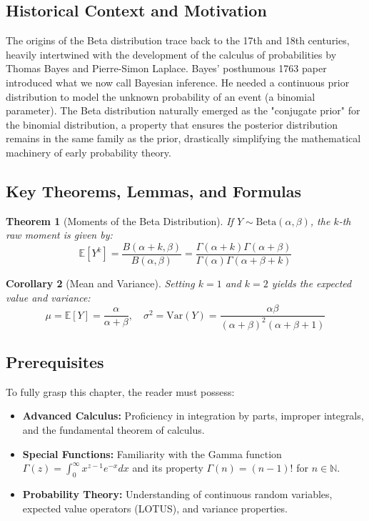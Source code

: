 \documentclass[11pt, a4paper]{article}
\newtheorem{theorem}{Theorem}[section]
\newtheorem{corollary}[theorem]{Corollary}
\theoremstyle{definition}
\theoremstyle{remark}
\newcommand{\N}{\mathbb{N}}
\newcommand{\E}{\mathbb{E}}
\begin{document}
\subsection{Historical Context and Motivation}
The origins of the Beta distribution trace back to the 17th and 18th centuries, heavily intertwined with the development of the calculus of probabilities by Thomas Bayes and Pierre-Simon Laplace. Bayes' posthumous 1763 paper introduced what we now call Bayesian inference. He needed a continuous prior distribution to model the unknown probability of an event (a binomial parameter). The Beta distribution naturally emerged as the "conjugate prior" for the binomial distribution, a property that ensures the posterior distribution remains in the same family as the prior, drastically simplifying the mathematical machinery of early probability theory.

\subsection{Key Theorems, Lemmas, and Formulas}
\begin{theorem}[Moments of the Beta Distribution]
If $Y \sim \text{Beta}(\alpha, \beta)$, the $k$-th raw moment is given by:
\[
\E[Y^k] = \frac{B(\alpha+k, \beta)}{B(\alpha, \beta)} = \frac{\Gamma(\alpha+k)\Gamma(\alpha+\beta)}{\Gamma(\alpha)\Gamma(\alpha+\beta+k)}
\]
\end{theorem}

\begin{corollary}[Mean and Variance]
Setting $k=1$ and $k=2$ yields the expected value and variance:
\[
\mu = \E[Y] = \frac{\alpha}{\alpha+\beta}, \quad \sigma^2 = \text{Var}(Y) = \frac{\alpha\beta}{(\alpha+\beta)^2(\alpha+\beta+1)}
\]
\end{corollary}

\subsection{Prerequisites}
To fully grasp this chapter, the reader must possess:
\begin{itemize}
    \item \textbf{Advanced Calculus:} Proficiency in integration by parts, improper integrals, and the fundamental theorem of calculus.
    \item \textbf{Special Functions:} Familiarity with the Gamma function $\Gamma(z) = \int_0^\infty x^{z-1}e^{-x}dx$ and its property $\Gamma(n) = (n-1)!$ for $n \in \N$.
    \item \textbf{Probability Theory:} Understanding of continuous random variables, expected value operators (LOTUS), and variance properties.
\end{itemize}
\end{document}
